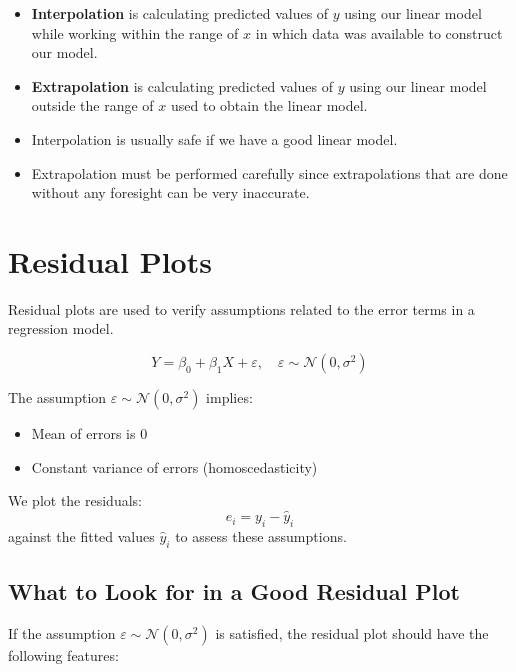 \begin{definition}
\vspace{-1em}
\begin{itemize}
    \item{\textbf{Interpolation}} is calculating predicted values of $y$ using our linear model while working within the range of $x$ in which data was available to construct our model.
    
    \item{\textbf{Extrapolation}} is calculating predicted values of $y$ using our linear model outside the range of $x$ used to obtain the linear model.
    
    \item Interpolation is usually safe if we have a good linear model.
    
    \item Extrapolation must be performed carefully since extrapolations that are done without any foresight can be very inaccurate.
\end{itemize}
\end{definition}
\section{Residual Plots}

Residual plots are used to verify assumptions related to the error terms in a regression model.

\[
Y = \beta_0 + \beta_1 X + \varepsilon, \quad \varepsilon \sim \mathcal{N}(0, \sigma^2)
\]

The assumption $\varepsilon \sim \mathcal{N}(0, \sigma^2)$ implies:
\begin{itemize}
    \item Mean of errors is 0
    \item Constant variance of errors (homoscedasticity)
\end{itemize}

\vspace{0.5em}
We plot the residuals:
\[
e_i = y_i - \hat{y}_i
\]
against the fitted values $\hat{y}_i$ to assess these assumptions.

\vspace{1em}
\subsection*{What to Look for in a Good Residual Plot}

If the assumption $\varepsilon \sim \mathcal{N}(0, \sigma^2)$ is satisfied, the residual plot should have the following features:

